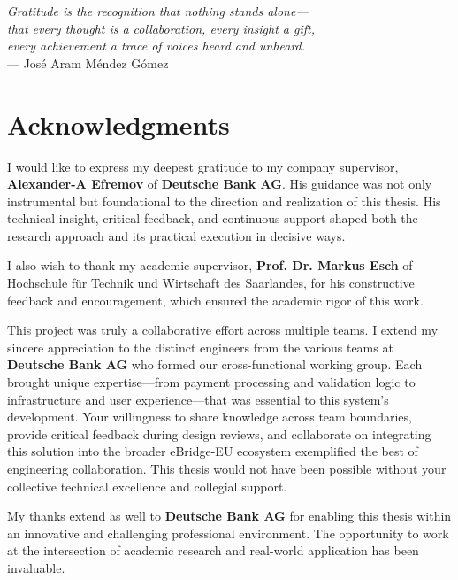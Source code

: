 
\begin{flushright}{\slshape    
    Gratitude is the recognition that nothing stands alone— \\
    that every thought is a collaboration, every insight a gift, \\
    every achievement a trace of voices heard and unheard.} \\ \medskip
    --- José Aram Méndez Gómez
\end{flushright}

\bigskip

\begingroup
\let\clearpage\relax
\let\cleardoublepage\relax
\chapter*{Acknowledgments}

I would like to express my deepest gratitude to my company supervisor, 
\textbf{Alexander-A Efremov} of \textbf{Deutsche Bank AG}. His guidance was 
not only instrumental but foundational to the direction and realization of 
this thesis. His technical insight, critical feedback, and continuous support 
shaped both the research approach and its practical execution in decisive ways.

I also wish to thank my academic supervisor, \textbf{Prof. Dr. Markus Esch} 
of Hochschule für Technik und Wirtschaft des Saarlandes, for his constructive 
feedback and encouragement, which ensured the academic rigor of this work.

This project was truly a collaborative effort across multiple teams. I extend my 
sincere appreciation to the distinct engineers from the various teams at 
\textbf{Deutsche Bank AG} who formed our cross-functional working group. Each 
brought unique expertise—from payment processing and validation logic to infrastructure 
and user experience—that was essential to this system's development. Your willingness 
to share knowledge across team boundaries, provide critical feedback during design 
reviews, and collaborate on integrating this solution into the broader eBridge-EU 
ecosystem exemplified the best of engineering collaboration. This thesis would not 
have been possible without your collective technical excellence and collegial support.

My thanks extend as well to \textbf{Deutsche Bank AG} for enabling this thesis 
within an innovative and challenging professional environment. The opportunity 
to work at the intersection of academic research and real-world application 
has been invaluable.

\endgroup
